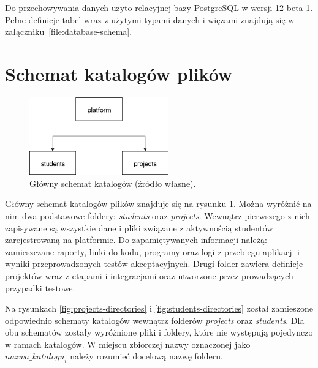 Do przechowywania danych użyto relacyjnej bazy PostgreSQL w wersji 12 beta 1.
Pełne definicje tabel wraz z użytymi typami danych i więzami znajdują się w załączniku~\ref{file:database-schema}.


\section{Schemat katalogów plików}
\label{directories}

\begin{figure}[h]
    \centering
    \includegraphics[width = 6cm]{chapter05/platform_main_dirs.png}
    \caption{Główny schemat katalogów (źródło własne).}
    \label{fig:platform-main-directories}
\end{figure}

Główny schemat katalogów plików znajduje się na rysunku \ref{fig:platform-main-directories}.
Można wyróżnić na nim dwa podstawowe foldery: \textit{students} oraz \textit{projects}.
Wewnątrz pierwszego z nich zapisywane są wszystkie dane i pliki związane z aktywnością studentów zarejestrowaną na platformie.
Do zapamiętywanych informacji należą: zamieszczane raporty, linki do kodu, programy oraz logi z przebiegu aplikacji i wyniki przeprowadzonych testów akceptacyjnych.
Drugi folder zawiera definicje projektów wraz z etapami i integracjami oraz utworzone przez prowadzących przypadki testowe.

Na rysunkach \ref{fig:projects-directories} i \ref{fig:students-directories} został zamieszone odpowiednio schematy katalogów wewnątrz folderów \textit{projects} oraz \textit{students}.
Dla obu schematów zostały wyróżnione pliki i foldery, które nie występują pojedynczo w ramach katalogów.
W miejscu zbiorczej nazwy oznaczonej jako ${nazwa\_katalogu}_{i}$ należy rozumieć docelową nazwę folderu.

